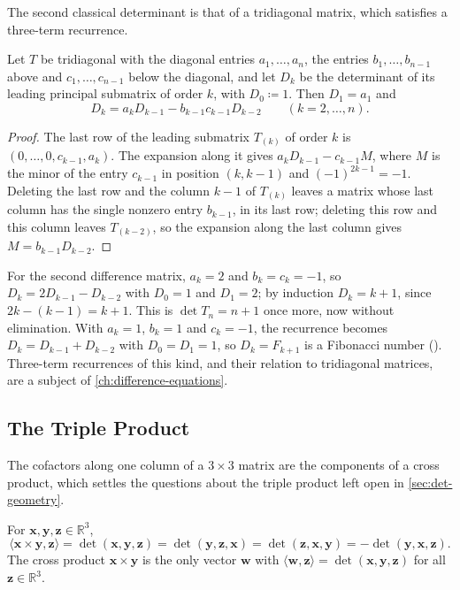 The second classical determinant is that of a tridiagonal matrix, which satisfies a three-term recurrence.

\begin{proposition}
\label{prop:tridiagonal-det}
Let $T$ be tridiagonal with the diagonal entries $a_1,\ldots,a_n$, the entries $b_1,\ldots,b_{n-1}$ above and $c_1,\ldots,c_{n-1}$ below the diagonal, and let $D_k$ be the determinant of its leading principal submatrix of order $k$, with $D_0\coloneqq1$. Then $D_1=a_1$ and
\[
D_k=a_kD_{k-1}-b_{k-1}c_{k-1}D_{k-2}\qquad(k=2,\ldots,n).
\]
\end{proposition}

\begin{proof}
The last row of the leading submatrix $T_{(k)}$ of order $k$ is $(0,\ldots,0,c_{k-1},a_k)$. The expansion along it gives $a_kD_{k-1}-c_{k-1}M$, where $M$ is the minor of the entry $c_{k-1}$ in position $(k,k-1)$ and $(-1)^{2k-1}=-1$. Deleting the last row and the column $k-1$ of $T_{(k)}$ leaves a matrix whose last column has the single nonzero entry $b_{k-1}$, in its last row; deleting this row and this column leaves $T_{(k-2)}$, so the expansion along the last column gives $M=b_{k-1}D_{k-2}$.
\end{proof}

For the second difference matrix, $a_k=2$ and $b_k=c_k=-1$, so $D_k=2D_{k-1}-D_{k-2}$ with $D_0=1$ and $D_1=2$; by induction $D_k=k+1$, since $2k-(k-1)=k+1$. This is $\det T_n=n+1$ once more, now without elimination. With $a_k=1$, $b_k=1$ and $c_k=-1$, the recurrence becomes $D_k=D_{k-1}+D_{k-2}$ with $D_0=D_1=1$, so $D_k=F_{k+1}$ is a Fibonacci number (). Three-term recurrences of this kind, and their relation to tridiagonal matrices, are a subject of \cref{ch:difference-equations}.

\subsection{The Triple Product}

The cofactors along one column of a $3\times3$ matrix are the components of a cross product, which settles the questions about the triple product left open in \cref{sec:det-geometry}.

\begin{proposition}
\label{prop:triple-product}
For $\mathbf x,\mathbf y,\mathbf z\in\mathbb R^3$,
\[
\langle\mathbf x\times\mathbf y,\mathbf z\rangle=\det(\mathbf x,\mathbf y,\mathbf z)=\det(\mathbf y,\mathbf z,\mathbf x)=\det(\mathbf z,\mathbf x,\mathbf y)=-\det(\mathbf y,\mathbf x,\mathbf z).
\]
The cross product $\mathbf x\times\mathbf y$ is the only vector $\mathbf w$ with $\langle\mathbf w,\mathbf z\rangle=\det(\mathbf x,\mathbf y,\mathbf z)$ for all $\mathbf z\in\mathbb R^3$.
\end{proposition}

